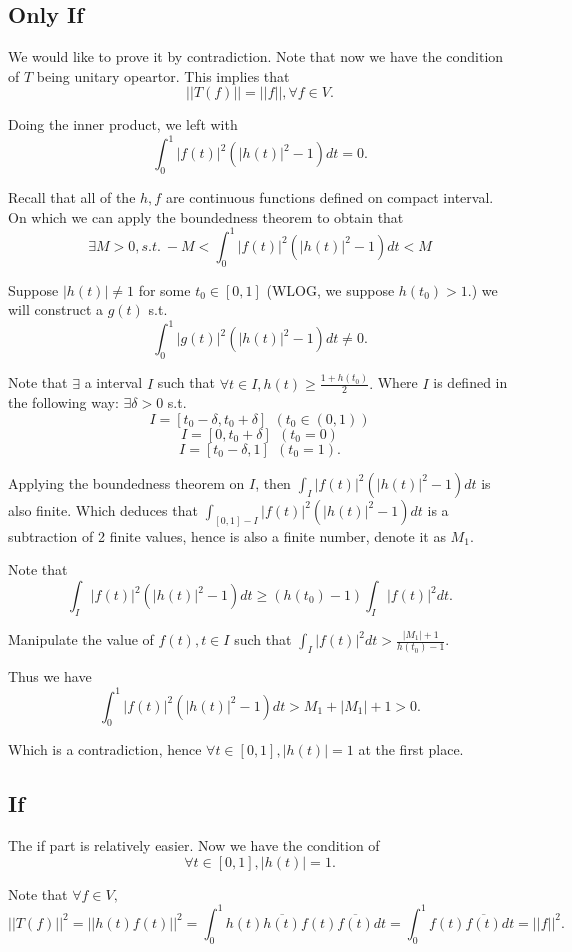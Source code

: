 \documentclass[12pt]{article}%
\begin{document}
\subsection{Only If}

We would like to prove it by contradiction. Note that now we have the condition of 
$T$ being unitary opeartor. This implies that 
$$||T(f)||=||f||, \forall f\in V.$$

Doing the inner product, we left with 
$$\int_{0}^1 |f(t)|^2 (|h(t)|^2-1)dt=0.$$

Recall that all of the $h,f$ are continuous functions defined on compact interval.
On which we can apply the boundedness theorem to obtain that 
$$\exists M>0, s.t.~-M<\int_{0}^1 |f(t)|^2 (|h(t)|^2-1)dt< M$$

Suppose $|h(t)|\neq 1$ for some $t_0 \in [0,1]$ (WLOG, we suppose $h(t_0)>1.$) we will construct a $g(t)$ s.t. 
$$\int_{0}^1 |g(t)|^2 (|h(t)|^2-1)dt \neq0.$$

Note that $\exists$ a interval $I$ such that $\forall t\in I, h(t)\geq \frac{1+h(t_0)}{2}.$ 
Where $I$ is defined in the following way: $\exists \delta>0 $ s.t. 
$$I=[t_0-\delta,t_0+\delta]~~(t_0 \in (0,1))$$
$$I=[0,t_0+\delta]~~(t_0 =0)$$
$$I=[t_0-\delta,1]~~(t_0 =1).$$

Applying the boundedness theorem on $I$, then $\int_{I} |f(t)|^2 (|h(t)|^2-1)dt$ is also finite. 
Which deduces that $\int_{[0,1]-I} |f(t)|^2 (|h(t)|^2-1)dt$ is a subtraction of 2 finite values, 
hence is also a finite number, denote it as $M_1$. 

Note that $$\int_{I} |f(t)|^2 (|h(t)|^2-1)dt \geq (h(t_0)-1)\int_{I} |f(t)|^2 dt.$$

Manipulate the value of $f(t), t\in I$ such that $\int_{I} |f(t)|^2 dt > \frac{|M_1|+1}{h(t_0)-1}.$

Thus we have $$\int_{0}^1 |f(t)|^2 (|h(t)|^2-1)dt>M_1 + |M_1| +1>0.$$

Which is a contradiction, hence $\forall t\in [0,1], |h(t)|=1$ at the first place.

\subsection{If}

The if part is relatively easier. Now we have the condition of 
$$\forall t\in [0,1], |h(t)|=1.$$

Note that $\forall f \in V,$ $$|| T(f) ||^2=|| h(t)f(t) ||^2
=\int_{0}^1 h(t)\overline{h(t)}f(t)\overline{f(t)}dt
=\int_{0}^1 f(t)\overline{f(t)}dt
=||f||^2.$$
\end{document}
